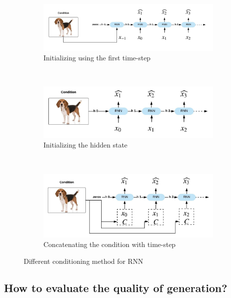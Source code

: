 \begin{figure}
    \centering
    \begin{subfigure}[b]{\textwidth}
        \includegraphics[width=\textwidth]{images/gbem/conditioning_model/first_timestep.jpeg}
        \caption{Initializing using the first time-step}
        \label{subfig:first_timestep}
    \end{subfigure}
    ~
    \begin{subfigure}[b]{\textwidth}
        \includegraphics[width=\textwidth]{images/gbem/conditioning_model/hidden_state.jpeg}
        \caption{Initializing the hidden state}
        \label{subfig:hidden_state}
    \end{subfigure}
    ~
    \begin{subfigure}[b]{\textwidth}
        \includegraphics[width=\textwidth]{images/gbem/conditioning_model/cat_timestep.jpeg}
        \caption{Concatenating the condition with time-step}
        \label{subfig:cat_timestep}
    \end{subfigure}
    \caption{Different conditioning method for RNN}
    \label{fig:conditioning_model}
\end{figure}

\subsection{How to evaluate the quality of generation?}\label{sec:eval_metrics}

